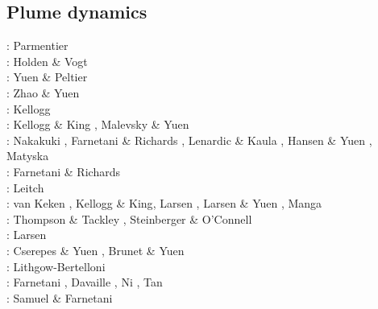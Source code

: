 \subsection{Plume dynamics}

\begin{scriptsize}
\noindent
\nineteenseventyfive: Parmentier \etal \cite{patt75}\\
\nineteenseventyseven: Holden \& Vogt \cite{hovo77}\\
\nineteeneighty: Yuen \& Peltier \cite{yupe80}\\
\nineteeneightyseven: Zhao \& Yuen \cite{zhyu87}\\
\nineteenninetyone: Kellogg \cite{kell91}\\
\nineteenninetythree: Kellogg \& King \cite{keki93}, Malevsky \& Yuen \cite{mayu93}\\
\nineteenninetyfour: Nakakuki \etal \cite{nasf94}, Farnetani \& Richards \cite{fari94},
                     Lenardic \& Kaula \cite{leka94b}, Hansen \& Yuen \cite{hayu94},
                     Matyska \etal \cite{mamy94}\\
\nineteenninetyfive: Farnetani \& Richards \cite{fari95}\\
\nineteenninetysix: Leitch \etal \cite{lesy96} \\
\nineteenninetyseven: van Keken \cite{vank97}, Kellogg \& King\cite{keki97},
                      Larsen \etal \cite{laym97}, Larsen \& Yuen \cite{layu97,layu97b},
                      Manga \cite{mang97}\\
\nineteenninetyeight: Thompson \& Tackley \cite{thta98}, Steinberger \& O'Connell \cite{stoc98}\\
\nineteenninetynine: Larsen \etal \cite{lays99}\\
\twothousand: Cserepes \& Yuen \cite{csyu00}, Brunet \& Yuen \cite{bryu00}\\
\twothousandone: Lithgow-Bertelloni \cite{lirc01}\\
\twothousandtwo: Farnetani \etal \cite{falt02}, Davaille \etal \cite{dagl02},
                 Ni \etal \cite{nitg02}, Tan \etal \cite{tagh02}\\
\twothousandthree: Samuel \& Farnetani \cite{safa03}\\

\end{scriptsize}
